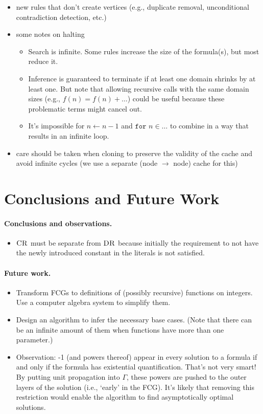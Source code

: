 \begin{itemize}
\item new rules that don't create vertices (e.g., duplicate removal, unconditional contradiction detection, etc.)
\item some notes on halting
  \begin{itemize}
  \item Search is infinite. Some rules increase the size of the formula(s), but most reduce it.
  \item Inference is guaranteed to terminate if at least one domain shrinks by at least one. But note that allowing recursive calls with the same domain sizes (e.g., $f(n) = f(n) + \dots$) could be useful because these problematic terms might cancel out.
  \item It's impossible for $n \gets n - 1$ and $\texttt{for } n \in \dots$ to combine in a way that results in an infinite loop.
  \end{itemize}
\item care should be taken when cloning to preserve the validity of the cache and avoid infinite cycles (we use a separate (node $\to$ node) cache for this)
\end{itemize}

\section{Conclusions and Future Work}

\paragraph{Conclusions and observations.}
\begin{itemize}
\item $\operatorname{\textsc{CR}}$ must be separate from $\operatorname{\textsc{DR}}$ because initially the requirement to not have the newly introduced constant in the literals is not satisfied.
\end{itemize}

\paragraph{Future work.}
\begin{itemize}
\item Transform FCGs to definitions of (possibly recursive) functions on integers. Use a computer algebra system to simplify them.
\item Design an algorithm to infer the necessary base cases. (Note that there can be an infinite amount of them when functions have more than one parameter.)
\item Observation: -1 (and powers thereof) appear in every solution to a formula if and only if the formula has existential quantification. That's not very smart! By putting unit propagation into $\Gamma$, these powers are pushed to the outer layers of the solution (i.e., `early' in the FCG). It's likely that removing this restriction would enable the algorithm to find asymptotically optimal solutions.
\end{itemize}
